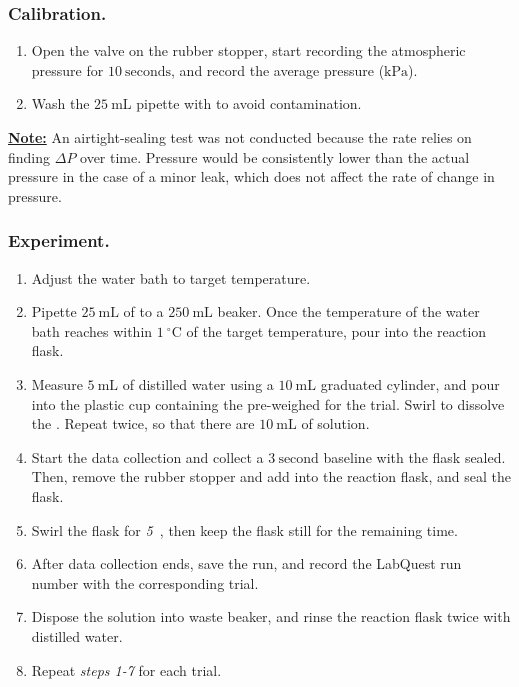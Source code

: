 \documentclass[hyphens]{article}
\begin{document}
\subsubsection{Calibration.}
\label{sec:research-design-procedure-Calibration}
\begin{enumerate}
  \item Open the valve on the rubber stopper, start recording the atmospheric pressure for $10\ \text{seconds}$, and record the average pressure ($\text{kPa}$).
  \item Wash the $25\ \text{mL}$ pipette with  to avoid contamination.
\end{enumerate}

\noindent \underline{\textbf{Note:}}  An airtight-sealing test was not conducted because the rate relies on finding $\Delta{P}$ over time. Pressure would be consistently lower than the actual pressure in the case of a minor leak, which does not affect the rate of change in pressure.

\subsubsection{Experiment.}
\label{sec:research-design-procedure-experiment}
\begin{enumerate}
  \item Adjust the water bath to target temperature.
  \item Pipette $25\ \text{mL}$ of  to a $250\ \text{mL}$ beaker. Once the temperature of the water bath reaches within $1\ ^\circ\text{C}$ of the target temperature, pour  into the reaction flask.
  \item Measure $5\ \text{mL}$ of distilled water using a $10\ \text{mL}$ graduated cylinder, and pour into the plastic cup containing the pre-weighed  for the trial. Swirl to dissolve the . Repeat twice, so that there are $10\ \text{mL}$ of  solution.
  \item Start the data collection and collect a $3\ \text{second}$ baseline with the flask sealed. Then, remove the rubber stopper and add  into the reaction flask, and seal the flask.
  \item Swirl the flask for \textit{5\ }, then keep the flask still for the remaining time.
  \item After data collection ends, save the run, and record the LabQuest run number with the corresponding trial.
  \item Dispose the solution into waste beaker, and rinse the reaction flask twice with distilled water.
  \item Repeat \textit{steps 1-7} for each trial.
\end{enumerate}
\end{document}
